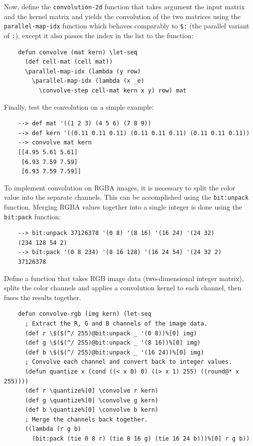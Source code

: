 Now, define the \verb|convolution-2d| function that takes argument the input matrix and the kernel matrix and yields the convolution of the two matrices using the \verb|parallel-map-idx| function which behaves comparably to \verb|$:| (the parallel variant of \verb|:|), except it also passes the index in the list to the function:

\begin{Verbatim}
    defun convolve (mat kern) \let-seq
      (def cell-mat (cell mat))
      \parallel-map-idx (lambda (y row)
        \parallel-map-idx (lambda (x _e)
          \convolve-step cell-mat kern x y) row) mat
\end{Verbatim}

Finally, test the convolution on a simple example:

\begin{Verbatim}
    --> def mat '((1 2 3) (4 5 6) (7 8 9))
    --> def kern '((0.11 0.11 0.11) (0.11 0.11 0.11) (0.11 0.11 0.11))
    --> convolve mat kern
    [[4.95 5.61 5.61]
     [6.93 7.59 7.59]
     [6.93 7.59 7.59]]
\end{Verbatim}

To implement convolution on RGBA images, it is necessary to split the color value into the separate channels. This can be accomplished using the \verb|bit:unpack| function. Merging RGBA values together into a single integer is done using the \verb|bit:pack| function:

\begin{Verbatim}
    --> bit:unpack 37126378 '(0 8) '(8 16) '(16 24) '(24 32)
    (234 128 54 2)
    --> bit:pack '(0 8 234) '(8 16 128) '(16 24 54) '(24 32 2)
    37126378
\end{Verbatim}

Define a function that takes RGB image data (two-dimensional integer matrix), splits the color channels and applies a convolution kernel to each channel, then fuses the results together.

\begin{Verbatim}
    defun convolve-rgb (img kern) (let-seq
      ; Extract the R, G and B channels of the image data.
      (def r \$($(^/ 255)@bit:unpack _ '(0 8))%[0] img)
      (def g \$($(^/ 255)@bit:unpack _ '(8 16))%[0] img)
      (def b \$($(^/ 255)@bit:unpack _ '(16 24))%[0] img)
      ; Convolve each channel and convert back to integer values.
      (defun quantize x (cond ((< x 0) 0) ((> x 1) 255) ((round@* x 255))))
      (def r \quantize%[0] \convolve r kern)
      (def g \quantize%[0] \convolve g kern)
      (def b \quantize%[0] \convolve b kern)
      ; Merge the channels back together.
      ((lambda (r g b)
        (bit:pack (tie 0 8 r) (tie 8 16 g) (tie 16 24 b)))%[0] r g b))
\end{Verbatim}

